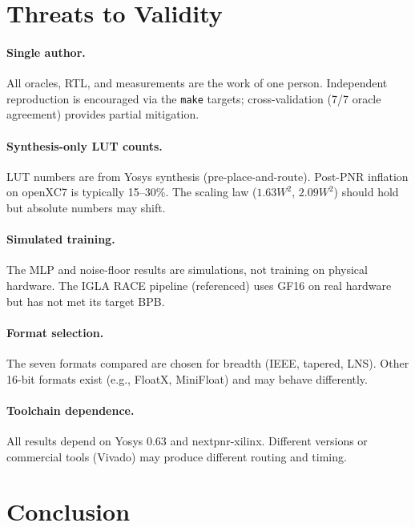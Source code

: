 \documentclass[11pt]{article}
\begin{document}
\section{Threats to Validity}

\paragraph{Single author.} All oracles, RTL, and measurements are the
work of one person. Independent reproduction is encouraged via the
\texttt{make} targets; cross-validation (7/7 oracle agreement) provides
partial mitigation.

\paragraph{Synthesis-only LUT counts.} LUT numbers are from Yosys
synthesis (pre-place-and-route). Post-PNR inflation on openXC7 is
typically 15--30\%. The scaling law ($1.63W^2$, $2.09W^2$) should hold
but absolute numbers may shift.

\paragraph{Simulated training.} The MLP and noise-floor results are
simulations, not training on physical hardware. The IGLA RACE pipeline
(referenced) uses GF16 on real hardware but has not met its target BPB.

\paragraph{Format selection.} The seven formats compared are chosen for
breadth (IEEE, tapered, LNS). Other 16-bit formats exist (e.g.,
FloatX, MiniFloat) and may behave differently.

\paragraph{Toolchain dependence.} All results depend on Yosys 0.63 and
nextpnr-xilinx. Different versions or commercial tools (Vivado) may
produce different routing and timing.

\section{Conclusion}\label{sec:conclusion}
\end{document}
